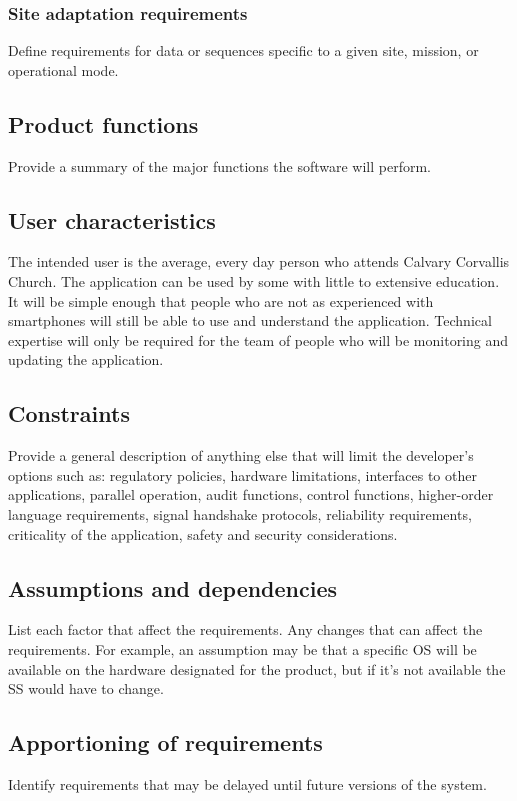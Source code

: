 \documentclass[letterpaper,10pt,draftclsnofoot,onecolumn,titlepage]{IEEEtran}
\begin{document}
	\subsubsection{Site adaptation requirements}
	Define requirements for data or sequences specific to a given site, mission, or operational mode.
		
	\subsection{Product functions}
	Provide a summary of the major functions the software will perform.
	
	\subsection{User characteristics}
	The intended user is the average, every day person who attends Calvary Corvallis Church. 
	The application can be used by some with little to extensive education.
	It will be simple enough that people who are not as experienced with smartphones will still be able to use and understand the application. 
	Technical expertise will only be required for the team of people who will be monitoring and updating the application. 
	
	\subsection{Constraints}
	Provide a general description of anything else that will limit the developer's options such as: regulatory policies, hardware limitations, interfaces to other applications, parallel operation, audit functions, control functions, higher-order language requirements, signal handshake protocols, reliability requirements, criticality of the application, safety and security considerations.
	
	\subsection{Assumptions and dependencies} 
	List each factor that affect the requirements. 
	Any changes that can affect the requirements. 
	For example, an assumption may be that a specific OS will be available on the hardware designated for the product, but if it's not available the SS would have to change.
	
	\subsection{Apportioning of requirements}
	Identify requirements that may be delayed until future versions of the system.
	
\end{document}
